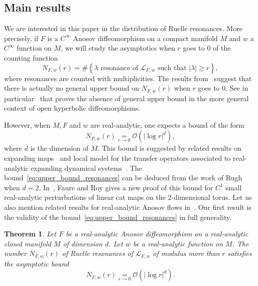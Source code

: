\documentclass[10pt]{amsart}
\newtheorem{theo}{Theorem}[section]
\theoremstyle{definition}\newtheorem{defi}[theo]{Definition}\newtheorem{rema}[theo]{Remark}\newtheorem{exam}[theo]{Example}\newtheorem{exem}[theo]{Example}\newtheorem{nota}[theo]{Notation}
\newcommand{\set}[1]{\left\{ #1 \right\}}
\newcommand{\p}[1]{\left(#1\right)}
\newcommand{\va}[1]{\left|#1\right|}
\newcommand{\clO}{\mathcal{O}}
\newcommand{\clL}{\mathcal{L}}
\begin{document}
\subsection{Main results}

We are interested in this paper in the distribution of Ruelle resonances. More precisely, if $F$ is a $C^\infty$ Anosov diffeomorphism on a compact manifold $M$ and $w$ a $C^\infty$ function on $M$, we will study the asymptotics when $r$ goes to $0$ of the counting function
\begin{equation*}
N_{F,w}(r) = \# \set{ \lambda \text{ resonance of } \clL_{F,w} \text{ such that } \va{\lambda} \geq r},
\end{equation*}
where resonances are counted with multiplicities. The results from~\cite{local_and_global} suggest that there is actually no general upper bound on $N_{F,w}(r)$ when $r$ goes to $0$. See in particular~\cite[Proposition~2.10]{local_and_global} that proves the absence of general upper bound in the more general context of open hyperbolic diffeomorphisms.

However, when $M,F$ and $w$ are real-analytic, one expects a bound of the form
\begin{equation}\label{eq:upper_bound_resonances}
N_{F,w}(r) \underset{r \to 0}{=} \clO\p{\va{\log r}^d},
\end{equation}
where $d$ is the dimension of $M$. This bound is suggested by related results on expanding maps~\cite{ bandtlow_naud,ruelle_zeta_expanding} and local model for the transfer operators associated to real-analytic expanding dynamical systems~\cite{naud_local}. The bound~\eqref{eq:upper_bound_resonances} can be deduced from the work of Rugh~\cite{rugh_correlation, rugh_fredholm_axiomA} when $d=2$. In~\cite[Theorem~7]{faure_roy}, Faure and Roy gives a new proof of this bound for $C^1$ small real-analytic perturbations of linear cat maps on the $2$-dimensional torus. Let us also mention related results for real-analytic Anosov flows in~\cite{fried_selberg,fried_zeta,BJ20}. Our first result is the validity of the bound~\eqref{eq:upper_bound_resonances} in full generality.

\begin{theo}\label{theorem:upper_bound_resonances}
Let $F$ be a real-analytic Anosov diffeomorphism on a real-analytic closed manifold $M$ of dimension $d$. Let $w$ be a real-analytic function on $M$. The number $N_{F,w}(r)$ of Ruelle resonances of $\clL_{F,w}$ of modulus more than $r$ satisfies the asymptotic bound
\begin{equation*}
N_{F,w}(r) \underset{r \to 0}{=} \clO\p{\va{\log r}^d}.
\end{equation*}
\end{theo}
\end{document}
